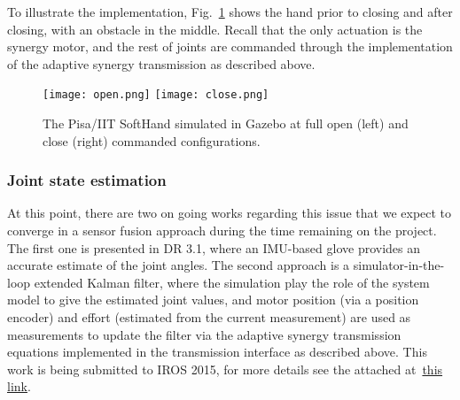 To illustrate the implementation, Fig.~\ref{fig:soft_hand_gazebo} shows the hand prior to closing and after closing, with an obstacle in the middle. Recall that the only actuation is the synergy motor, and the rest of joints are commanded through the implementation of the adaptive synergy transmission as described above.

\begin{figure}
\centering
\texttt{[image: open.png]}
\hspace{1pt}
\texttt{[image: close.png]}
\caption{The Pisa/IIT SoftHand simulated in Gazebo at full open (left) and close (right) commanded configurations.}
\label{fig:soft_hand_gazebo}
\end{figure}

\subsubsection{Joint state estimation}

At this point, there are two on going works regarding this issue that we expect to converge in a sensor fusion approach during the time remaining on the project. The first one is presented in DR 3.1, where an IMU-based glove provides an accurate estimate of the joint angles. The second approach is a simulator-in-the-loop extended Kalman filter, where the simulation play the role of the system model to give the estimated joint values, and motor position (via a position encoder) and effort (estimated from the current measurement) are used as measurements to update the filter via the adaptive synergy transmission equations implemented in the transmission interface as described above. This work is being submitted to IROS 2015, for more details see the attached at~\href{}{this link}.